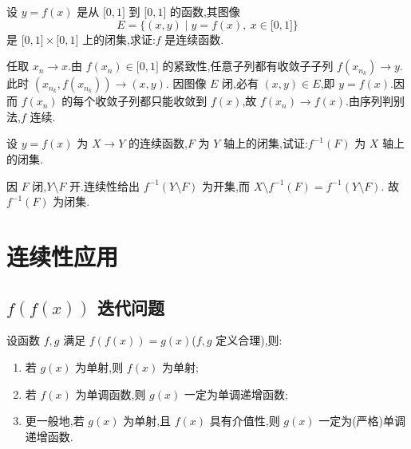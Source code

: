 \begin{example}
    设 $y=f(x)$ 是从 $\lbrack 0,1\rbrack$ 到 $\lbrack 0,1\rbrack$ 的函数,其图像
    \[
        E=\{(x,y)\mid y=f(x),\ x\in\lbrack 0,1\rbrack\}
    \]
    是 $\lbrack 0,1\rbrack\times\lbrack 0,1\rbrack$ 上的闭集,求证:$f$ 是连续函数.
\end{example}
\exampleblank

\begin{solution}
    任取 $x_n\to x$.由 $f(x_n)\in\lbrack0,1\rbrack$ 的紧致性,任意子列都有收敛子子列 $f(x_{n_k})\to y$.此时 $(x_{n_k},f(x_{n_k}))\to(x,y)$.
    因图像 $E$ 闭,必有 $(x,y)\in E$,即 $y=f(x)$.因而 $f(x_n)$ 的每个收敛子列都只能收敛到 $f(x)$,故 $f(x_n)\to f(x)$.由序列判别法,$f$ 连续.
\end{solution}

\begin{example}
    设 $y=f(x)$ 为 $X\to Y$ 的连续函数,$F$ 为 $Y$ 轴上的闭集,试证:$f^{-1}(F)$ 为 $X$ 轴上的闭集.
\end{example}
\exampleblank

\begin{solution}
    因 $F$ 闭,$Y\setminus F$ 开.连续性给出 $f^{-1}(Y\setminus F)$ 为开集,而 $X\setminus f^{-1}(F)=f^{-1}(Y\setminus F)$.
    故 $f^{-1}(F)$ 为闭集.
\end{solution}


\newpage

\section{连续性应用}


\subsection{\texorpdfstring{$f(f(x))$}{f(f(x))} 迭代问题}

\begin{proposition}[\markstar]
    设函数 $f,g$ 满足 $f(f(x))=g(x)$($f,g$ 定义合理),则:
    \begin{enumerate}
        \item 若 $g(x)$ 为单射,则 $f(x)$ 为单射;
        \item 若 $f(x)$ 为单调函数,则 $g(x)$ 一定为单调递增函数;
        \item 更一般地,若 $g(x)$ 为单射,且 $f(x)$ 具有介值性,则 $g(x)$ 一定为(严格)单调递增函数.
    \end{enumerate}
\end{proposition}

